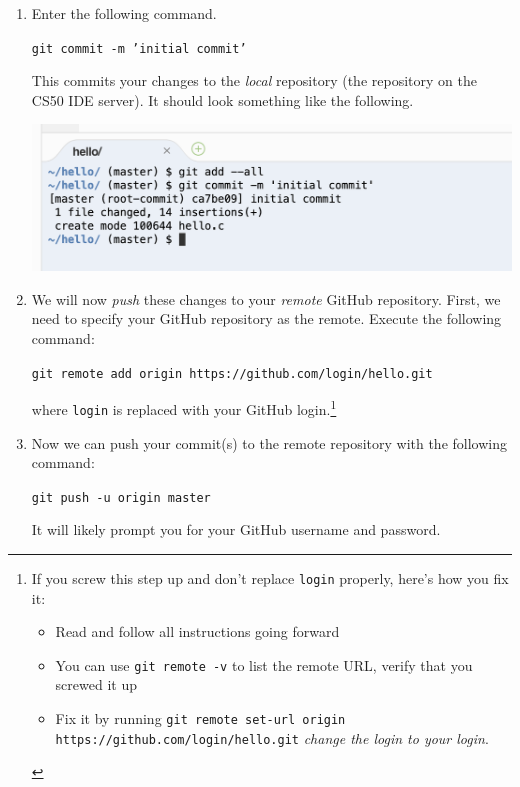 \documentclass[12pt]{scrartcl}
\begin{document}
\begin{enumerate}
  \item Enter the following command.

  \texttt{git commit -m 'initial commit'}
  
  This commits your changes to the \emph{local} repository
  (the repository on the CS50 IDE server).  It should look something
  like the following.
  
  \begin{center}
  \includegraphics[scale=0.50]{./hack1.0-files/cl-gitcommit}
  \end{center}

  \item We will now \emph{push} these changes to your \emph{remote}
  GitHub repository.  First, we need to specify your GitHub 
  repository as the remote.  Execute the following command:
  
  \texttt{git remote add origin https://github.com/login/hello.git}
  
  where \texttt{login} is replaced with your GitHub login.\footnote{
  If you screw this step up and don't replace \texttt{login} properly, 
  here's how you fix it: 
  \begin{itemize}
    \item Read and follow all instructions going forward
    \item You can use \texttt{git remote -v} to list the remote URL, 
    verify that you screwed it up
    \item Fix it by running 
    \texttt{git remote set-url origin https://github.com/login/hello.git}
    \emph{change the login to your login}.
  \end{itemize}
  }
  
  \item Now we can push your commit(s) to the remote repository
  with the following command:
  
  \texttt{git push -u origin master}
  
  It will likely prompt you for your GitHub username and password.


\end{enumerate}
\end{document}
